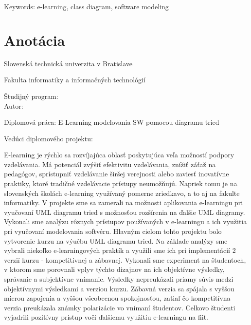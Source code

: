 
Keywords: e-learning, class diagram, software modeling

\newpage{}\thispagestyle{empty}

\newpage
\thispagestyle{empty}
\mbox{}
\newpage

\thispagestyle{empty}
\section*{Anotácia}

\begin{minipage}[t]{1\columnwidth}%
Slovenská technická univerzita v Bratislave

Fakulta informatiky a informačných technológií

Študijný program: \myStudyProgram\\

Autor: \myName

Diplomová práca: E-Learning modelovania SW pomocou diagramu tried

Vedúci diplomového projektu: \mySupervisor

\myDate%
\end{minipage}

\bigskip{}


E-learning je rýchlo sa rozvíjajúca oblasť poskytujúca veľa možností podpory vzdelávania. Má potenciál zvýšiť efektivitu vzdelávania, znížiť záťaž na pedagógov, sprístupniť vzdelávanie širšej verejnosti alebo zaviesť inovatívne praktiky, ktoré tradičné vzdelávacie prístupy neumožňujú. Napriek tomu je na slovenských školách e-learning využívaný pomerne zriedkavo, a to aj na fakulte informatiky. V projekte sme sa zamerali na možnosti aplikovania e-learningu pri vyučovaní UML diagramu tried s možnosťou rozšírenia na ďalšie UML diagramy. Vykonali sme analýzu rôznych prístupov používaných v e-learningu a ich využitia pri vyučovaní modelovania softvéru. Hlavným cieľom tohto projektu bolo vytvorenie kurzu na výučbu UML diagramu tried. Na základe analýzy sme vybrali niekoľko e-learningových praktík a využili sme ich pri implementácií 2 verzií kurzu - kompetitívnej a zábavnej. Vykonali sme experiment na študentoch, v ktorom sme porovnali vplyv týchto dizajnov na ich objektívne výsledky, správanie a subjektívne vnímanie. Výsledky nepreukázali priamy súvis medzi objektívnymi výsledkami a verziou kurzu. Zábavná verzia sa spájala s vyššou mierou zapojenia a vyššou všeobecnou spokojnosťou, zatiaľ čo kompetitívna verzia preukázala známky polarizácie vo vnímaní študentov. Celkovo študenti vyjadrili pozitívny prístup voči ďalšiemu využitiu e-learningu na \ac{fiit}.

